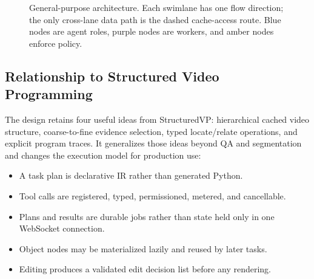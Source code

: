 \documentclass[11pt]{article}
\begin{document}
\begin{figure}[H]
{%
}
\caption{General-purpose architecture. Each swimlane has one flow direction;
the only cross-lane data path is the dashed cache-access route. Blue nodes are
agent roles, purple nodes are workers, and amber nodes enforce policy.}
\label{fig:architecture}
\end{figure}

\subsection{Relationship to Structured Video Programming}

The design retains four useful ideas from StructuredVP: hierarchical cached
video structure, coarse-to-fine evidence selection, typed locate/relate
operations, and explicit program traces. It generalizes those ideas beyond QA
and segmentation and changes the execution model for production use:

\begin{itemize}
  \item A task plan is declarative IR rather than generated Python.
  \item Tool calls are registered, typed, permissioned, metered, and cancellable.
  \item Plans and results are durable jobs rather than state held only in one
  WebSocket connection.
  \item Object nodes may be materialized lazily and reused by later tasks.
  \item Editing produces a validated edit decision list before any rendering.
\end{itemize}
\end{document}
